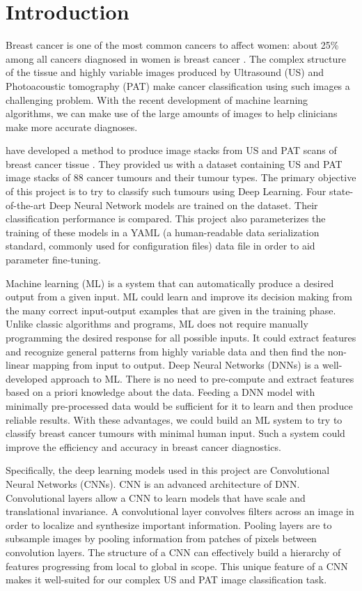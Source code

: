 \chapter{Introduction} %

Breast cancer is one of the most common cancers to affect women: about 25\% among all cancers diagnosed in women is breast cancer \citep{Siegel2015}. The complex structure of the tissue and highly variable images produced by Ultrasound (US) and Photoacoustic tomography (PAT) make cancer classification using such images a challenging problem. With the recent development of machine learning algorithms, we can make use of the large amounts of images to help clinicians make more accurate diagnoses. 

\citeauthor{Kosik2019} have developed a method to produce image stacks from US and PAT scans of breast cancer tissue \citep{Kosik2019}. They provided us with a dataset containing US and PAT image stacks of 88 cancer tumours and their tumour types. The primary objective of this project is to try to classify such tumours using Deep Learning. Four state-of-the-art Deep Neural Network models are trained on the dataset. Their classification performance is compared. This project also parameterizes the training of these models in a YAML \citep{yaml} (a human-readable data serialization standard, commonly used for configuration files) data file in order to aid parameter fine-tuning.

Machine learning (ML) is a system that can automatically produce a desired output from a given input. ML could learn and improve its decision making from the many correct input-output examples that are given in the training phase. Unlike classic algorithms and programs, ML does not require manually programming the desired response for all possible inputs. It could extract features and recognize general patterns from highly variable data and then find the non-linear mapping from input to output. Deep Neural Networks (DNNs) \citep{LeCun2015} is a well-developed approach to ML. There is no need to pre-compute and extract features based on a priori knowledge about the data. Feeding a DNN model with minimally pre-processed data would be sufficient for it to learn and then produce reliable results. With these advantages, we could build an ML system to try to classify breast cancer tumours with minimal human input. Such a system could improve the efficiency and accuracy in breast cancer diagnostics.

Specifically, the deep learning models used in this project are Convolutional Neural Networks (CNNs). CNN \citep{Krizhevsky2017} is an advanced architecture of DNN. Convolutional layers allow a CNN to learn models that have scale and translational invariance. A convolutional layer convolves filters across an image in order to localize and synthesize important information. Pooling layers are to subsample images by pooling information from patches of pixels between convolution layers. The structure of a CNN can effectively build a hierarchy of features progressing from local to global in scope. This unique feature of a CNN makes it well-suited for our complex US and PAT image classification task.

